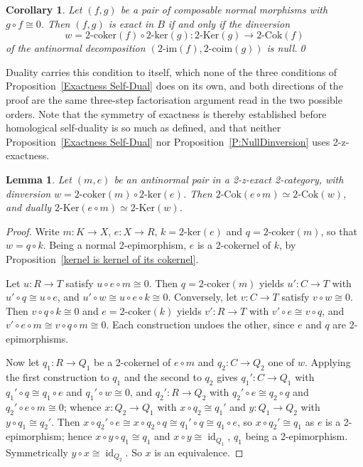 \documentclass[reqno,a4paper]{amsart}
\numberwithin{equation}{section}
\theoremstyle{plain}
\newtheorem{lemma}[subsection]{Lemma}
\newtheorem{corollary}[subsection]{Corollary}
\theoremstyle{definition}
\newcommand{\noproof}{\hfill \qed}
\def\nameit#1{\textrm{#1}~}
\def\prox{\nameit{Proposition}}
\newcommand{\comp}{\circ}
\newcommand{\iso}{\cong}
\renewcommand{\1}{\onecat{1}}
\newcommand{\TwoKer}{\ensuremath{2\text{-}\mathrm{Ker}}}
\newcommand{\TwoCoker}{\ensuremath{2\text{-}\mathrm{Cok}}}
\newcommand{\twoker}{\ensuremath{2\text{-}\mathrm{ker}}}
\newcommand{\twocoker}{\ensuremath{2\text{-}\mathrm{coker}}}
\newcommand{\twoimg}{\ensuremath{2\text{-}\mathrm{im}}}
\newcommand{\twocoim}{\ensuremath{2\text{-}\mathrm{coim}}}
\newcommand{\id}[1]{\operatorname{id}_{#1}}
\begin{document}
\begin{corollary}\label{Cor Exact Null Dinversion}
	Let \((f,g)\) be a pair of composable normal morphisms with \(g\comp f\iso 0\). Then \((f,g)\) is exact in \(B\) if and only if the dinversion
	\[
		w=\twocoker(f)\comp\twoker(g)\colon\TwoKer(g)\to\TwoCoker(f)
	\]
	of the antinormal decomposition \((\twoimg(f),\twocoim(g))\) is null.\noproof
\end{corollary}

Duality carries this condition to itself, which none of the three conditions of \prox\ref{Exactness Self-Dual} does on its own, and both directions of the proof are the same three-step factorisation argument read in the two possible orders. Note that the symmetry of exactness is thereby established before homological self-duality is so much as defined, and that neither \prox\ref{Exactness Self-Dual} nor \prox\ref{P:NullDinversion} uses 2-z-exactness.

\begin{lemma}\label{L:DinversionCoker}
	Let \((m,e)\) be an antinormal pair in a 2-z-exact 2-category, with dinversion \(w=\twocoker(m)\comp\twoker(e)\). Then \(\TwoCoker(e\comp m)\simeq\TwoCoker(w)\), and dually \(\TwoKer(e\comp m)\simeq\TwoKer(w)\).
\end{lemma}
\begin{proof}
	Write \(m\colon K\to X\), \(e\colon X\to R\), \(k=\twoker(e)\) and \(q=\twocoker(m)\), so that \(w=q\comp k\). Being a normal 2-epimorphism, \(e\) is a 2-cokernel of \(k\), by \prox\ref{kernel is kernel of its cokernel}.

	Let \(u\colon R\to T\) satisfy \(u\comp e\comp m\iso 0\). Then \(q=\twocoker(m)\) yields \(u'\colon C\to T\) with \(u'\comp q\iso u\comp e\), and \(u'\comp w\iso u\comp e\comp k\iso 0\). Conversely, let \(v\colon C\to T\) satisfy \(v\comp w\iso 0\). Then \(v\comp q\comp k\iso 0\) and \(e=\twocoker(k)\) yields \(v'\colon R\to T\) with \(v'\comp e\iso v\comp q\), and \(v'\comp e\comp m\iso v\comp q\comp m\iso 0\). Each construction undoes the other, since \(e\) and \(q\) are 2-epimorphisms.

	Now let \(q_1\colon R\to Q_1\) be a 2-cokernel of \(e\comp m\) and \(q_2\colon C\to Q_2\) one of \(w\). Applying the first construction to \(q_1\) and the second to \(q_2\) gives \(q_1'\colon C\to Q_1\) with \(q_1'\comp q\iso q_1\comp e\) and \(q_1'\comp w\iso 0\), and \(q_2'\colon R\to Q_2\) with \(q_2'\comp e\iso q_2\comp q\) and \(q_2'\comp e\comp m\iso 0\); whence \(x\colon Q_2\to Q_1\) with \(x\comp q_2\iso q_1'\) and \(y\colon Q_1\to Q_2\) with \(y\comp q_1\iso q_2'\). Then \(x\comp q_2'\comp e\iso x\comp q_2\comp q\iso q_1'\comp q\iso q_1\comp e\), so \(x\comp q_2'\iso q_1\) as \(e\) is a 2-epimorphism; hence \(x\comp y\comp q_1\iso q_1\) and \(x\comp y\iso\id{Q_1}\), \(q_1\) being a 2-epimorphism. Symmetrically \(y\comp x\iso\id{Q_2}\). So \(x\) is an equivalence.
\end{proof}
\end{document}
